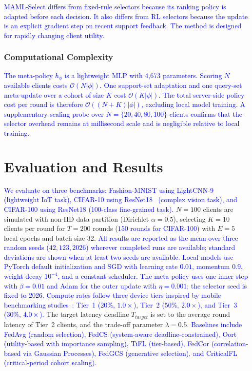 \documentclass[journal]{IEEEtran}
\newcommand{\revision}[1]{\textcolor{blue}{#1}}
\begin{document}
\revision{MAML-Select differs from fixed-rule selectors because its ranking policy is adapted before each decision. It also differs from RL selectors because the update is an explicit gradient step on recent support feedback. The method is designed for rapidly changing client utility.}

\subsubsection{Computational Complexity}
\revision{The meta-policy $h_\phi$ is a lightweight MLP with 4,673 parameters. Scoring $N$ available clients costs $\mathcal{O}(N|\phi|)$. One support-set adaptation and one query-set meta-update over a cohort of size $K$ cost $\mathcal{O}(K|\phi|)$. The total server-side policy cost per round is therefore $\mathcal{O}((N+K)|\phi|)$, excluding local model training. A supplementary scaling probe over $N=\{20,40,80,100\}$ clients confirms that the selector overhead remains at millisecond scale and is negligible relative to local training.}

\section{Evaluation and Results}

\revision{We evaluate on three benchmarks: Fashion-MNIST using LightCNN-9~\cite{wu2018light} (lightweight IoT task), CIFAR-10 using ResNet18~\cite{he2016deep} (complex vision task), and CIFAR-100 using ResNet18 (100-class fine-grained task).} $N = 100$ clients are simulated with non-IID data partition (Dirichlet $\alpha = 0.5$), selecting $K = 10$ clients per round for $T = 200$ rounds (\revision{$150$ rounds for CIFAR-100}) with $E = 5$ local epochs and batch size 32. \revision{All results are reported as the mean over three random seeds ($42, 123, 2026$) wherever completed runs are available; standard deviations are shown when at least two seeds are available.} \revision{Local models use PyTorch default initialization and SGD with learning rate $0.01$, momentum $0.9$, weight decay $10^{-4}$, and a constant scheduler. The meta-policy uses one inner step with $\beta=0.01$ and Adam for the outer update with $\eta=0.001$; the selector seed is fixed to 2026.} \revision{Compute rates follow three device tiers inspired by mobile benchmarking studies~\cite{ignatov2018ai}: Tier~1 (20\%, $1.0\times$), Tier~2 (50\%, $2.0\times$), and Tier~3 (30\%, $4.0\times$).} The target latency deadline $T_{target}$ is set to the average round latency of Tier~2 clients, and the trade-off parameter $\lambda = 0.5$. \revision{Baselines include FedAvg (random selection), FedCS (system-aware deadline-constrained), Oort (utility-based with importance sampling), TiFL (tier-based), FedCor (correlation-based via Gaussian Processes), FedGCS (generative selection), and CriticalFL (critical-period cohort scaling).}
\end{document}

